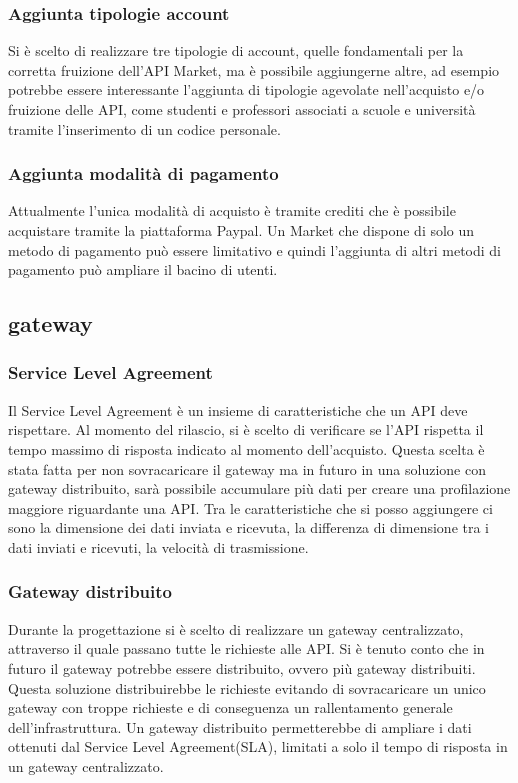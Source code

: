 \subsubsection{Aggiunta tipologie account}
Si è scelto di realizzare tre tipologie di account, quelle fondamentali per la corretta fruizione dell'API Market, ma è possibile aggiungerne altre, ad esempio potrebbe essere interessante l'aggiunta di tipologie agevolate nell'acquisto e/o fruizione delle API, come studenti e professori associati a scuole e università tramite l'inserimento di un codice personale.


\subsubsection{Aggiunta modalità di pagamento}
Attualmente l'unica modalità di acquisto è tramite crediti che è possibile acquistare tramite la piattaforma Paypal. Un Market che dispone di solo un metodo di pagamento può essere limitativo e quindi l'aggiunta di altri metodi di pagamento può ampliare il bacino di utenti.

\subsection{gateway}

\subsubsection{Service Level Agreement}
Il Service Level Agreement è un insieme di caratteristiche che un API deve rispettare. Al momento del rilascio, si è scelto di verificare se l'API rispetta il tempo massimo di risposta indicato al momento dell'acquisto. Questa scelta è stata fatta per non sovracaricare il gateway ma in futuro in una soluzione con gateway distribuito, sarà possibile accumulare più dati per creare una profilazione maggiore riguardante una API. Tra le caratteristiche che si posso aggiungere ci sono la dimensione dei dati inviata e ricevuta, la differenza di dimensione tra i dati inviati e ricevuti, la velocità di trasmissione.

\subsubsection{Gateway distribuito}
Durante la progettazione si è scelto di realizzare un gateway centralizzato, attraverso il quale passano tutte le richieste alle API. Si è tenuto conto che in futuro il gateway potrebbe essere distribuito, ovvero più gateway distribuiti. Questa soluzione distribuirebbe le richieste evitando di sovracaricare un unico gateway con troppe richieste e di conseguenza un rallentamento generale dell'infrastruttura. Un gateway distribuito permetterebbe di ampliare i dati ottenuti dal Service Level Agreement(SLA), limitati a solo il tempo di risposta in un gateway centralizzato.


